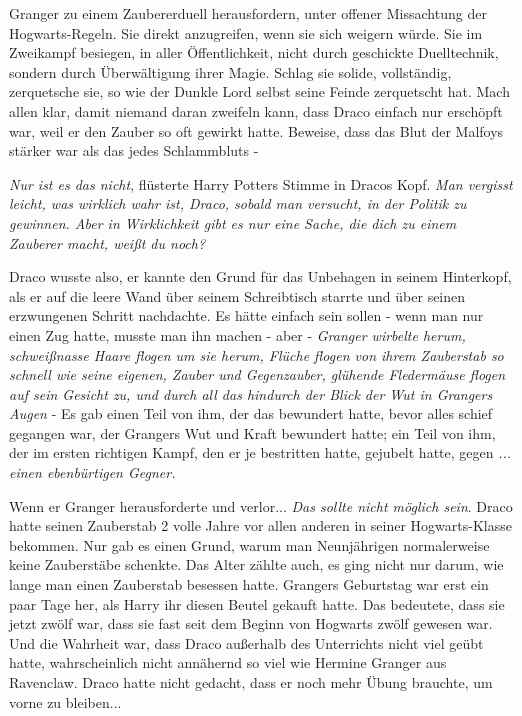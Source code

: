 Granger zu einem Zaubererduell herausfordern, unter offener Missachtung der
Hogwarts-Regeln. Sie direkt anzugreifen, wenn sie sich weigern würde. Sie im
Zweikampf besiegen, in aller Öffentlichkeit, nicht durch geschickte
Duelltechnik, sondern durch Überwältigung ihrer Magie. Schlag sie solide,
vollständig, zerquetsche sie, so wie der Dunkle Lord selbst seine Feinde
zerquetscht hat. Mach allen klar, damit niemand daran zweifeln kann, dass Draco
einfach nur erschöpft war, weil er den Zauber so oft gewirkt hatte. Beweise,
dass das Blut der Malfoys stärker war als das jedes Schlammbluts -

\emph{Nur ist es das nicht}, flüsterte Harry Potters Stimme in Dracos Kopf.
\emph{Man vergisst leicht, was wirklich wahr ist, Draco, sobald man versucht, in
der Politik zu gewinnen. Aber in Wirklichkeit gibt es nur eine Sache, die dich
zu einem Zauberer macht, weißt du noch?}

Draco wusste also, er kannte den Grund für das Unbehagen in seinem Hinterkopf,
als er auf die leere Wand über seinem Schreibtisch starrte und über seinen
erzwungenen Schritt nachdachte. Es hätte einfach sein sollen - wenn man nur
einen Zug hatte, musste man ihn machen - aber - \emph{Granger wirbelte herum,
schweißnasse Haare flogen um sie herum, Flüche flogen von ihrem Zauberstab so
schnell wie seine eigenen, Zauber und Gegenzauber, glühende Fledermäuse flogen
auf sein Gesicht zu, und durch all das hindurch der Blick der Wut in Grangers
Augen} - Es gab einen Teil von ihm, der das bewundert hatte, bevor alles schief
gegangen war, der Grangers Wut und Kraft bewundert hatte; ein Teil von ihm, der
im ersten richtigen Kampf, den er je bestritten hatte, gejubelt hatte,
gegen\emph{ ... einen ebenbürtigen Gegner.}

Wenn er Granger herausforderte und verlor... \emph{Das sollte nicht möglich
sein}. Draco hatte seinen Zauberstab 2 volle Jahre vor allen anderen in seiner
Hogwarts-Klasse bekommen. Nur gab es einen Grund, warum man Neunjährigen
normalerweise keine Zauberstäbe schenkte. Das Alter zählte auch, es ging nicht
nur darum, wie lange man einen Zauberstab besessen hatte. Grangers Geburtstag
war erst ein paar Tage her, als Harry ihr diesen Beutel gekauft hatte. Das
bedeutete, dass sie jetzt zwölf war, dass sie fast seit dem Beginn von Hogwarts
zwölf gewesen war. Und die Wahrheit war, dass Draco außerhalb des Unterrichts
nicht viel geübt hatte, wahrscheinlich nicht annähernd so viel wie Hermine
Granger aus Ravenclaw. Draco hatte nicht gedacht, dass er noch mehr Übung
brauchte, um vorne zu bleiben...

